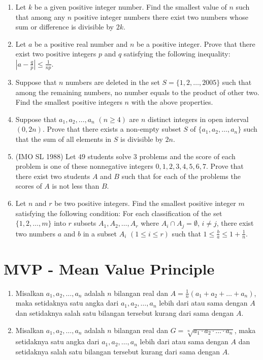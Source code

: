 \documentclass[11pt]{scrartcl}
\begin{document}
\begin{enumerate}
    \item Let $k$ be a given positive integer number. Find the smallest value of $n$ such that among any $n$ positive integer numbers there exist two numbers whose sum or difference is divisible by $2k$.
    
    \item Let $a$ be a positive real number and $n$ be a positive integer. Prove that there exist two positive integers $p$ and $q$ satisfying the following inequality: $\left|a-\frac{q}{p}\right| \le \frac{1}{np}$.
    
    \item Suppose that $n$ numbers are deleted in the set $S = \{1 ,2, \dots , 2005 \}$ such that among the remaining numbers, no number equals to the product of other two. Find the smallest positive integers $n$ with the above properties.
    
    \item Suppose that $a_1, a_2, \dots, a_n$ $(n \ge 4)$ are $n$ distinct integers in open interval $(0, 2n)$. Prove that there exists a non-empty subset $S$ of $\{a_1, a_2, \dots, a_n\}$ such that the sum of all elements in $S$ is divisible by $2n$.
    
    \item (IMO SL 1988) Let $49$ students solve $3$ problems and the score of each problem is one of these nonnegative integers $0, 1, 2, 3, 4, 5, 6, 7$. Prove that there exist two students $A$ and $B$ such that for each of the problems the scores of $A$ is not less than $B$.
    
    \item Let $n$ and $r$ be two positive integers. Find the smallest positive integer $m$ satisfying the following condition: For each classification of the set $\{1, 2, \dots, m \}$ into $r$ subsets $A_1, A_2, \dots, A_r$ where $A_i \cap A_j = \emptyset$, $i \neq j$, there exist two numbers $a$ and $b$ in a subset $A_i$ $(1 \le i \le r)$ such that $1 \le \frac{b}{a} \le 1 + \frac{1}{n}$.
\end{enumerate}

\section{MVP - Mean Value Principle}
\begin{definition}
    \begin{enumerate}
        \item Misalkan $a_1, a_2, \dots, a_n$ adalah $n$ bilangan real dan $A = \frac{1}{n}(a_1+a_2+\dots+a_n)$, maka setidaknya satu angka dari $a_1,a_2,\dots,a_n$ lebih dari atau sama dengan $A$ dan setidaknya salah satu bilangan tersebut kurang dari sama dengan $A$.
        
        \item  Misalkan $a_1, a_2, \dots, a_n$ adalah $n$ bilangan real dan $G = \sqrt[n]{a_1\cdot a_2\cdot\dots\cdot a_n}$, maka setidaknya satu angka dari $a_1,a_2,\dots,a_n$ lebih dari atau sama dengan $A$ dan setidaknya salah satu bilangan tersebut kurang dari sama dengan $A$.
    \end{enumerate}
\end{definition}
\end{document}
